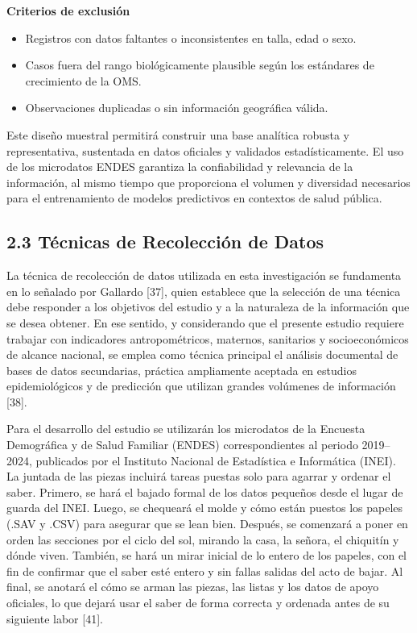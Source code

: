 \documentclass[
]{report}
\begin{document}
\textbf{Criterios de exclusión}

\begin{itemize}
\item
  Registros con datos faltantes o inconsistentes en talla, edad o sexo.
\item
  Casos fuera del rango biológicamente plausible según los estándares de
  crecimiento de la OMS.
\item
  Observaciones duplicadas o sin información geográfica válida.
\end{itemize}

Este diseño muestral permitirá construir una base analítica robusta y
representativa, sustentada en datos oficiales y validados
estadísticamente. El uso de los microdatos ENDES garantiza la
confiabilidad y relevancia de la información, al mismo tiempo que
proporciona el volumen y diversidad necesarios para el entrenamiento de
modelos predictivos en contextos de salud pública.

\hypertarget{tuxe9cnicas-de-recolecciuxf3n-de-datos}{%
\subsection{2.3 Técnicas de Recolección de
Datos}\label{tuxe9cnicas-de-recolecciuxf3n-de-datos}}

La técnica de recolección de datos utilizada en esta investigación se
fundamenta en lo señalado por Gallardo {[}37{]}, quien establece que la
selección de una técnica debe responder a los objetivos del estudio y a
la naturaleza de la información que se desea obtener. En ese sentido, y
considerando que el presente estudio requiere trabajar con indicadores
antropométricos, maternos, sanitarios y socioeconómicos de alcance
nacional, se emplea como técnica principal el análisis documental de
bases de datos secundarias, práctica ampliamente aceptada en estudios
epidemiológicos y de predicción que utilizan grandes volúmenes de
información {[}38{]}.

Para el desarrollo del estudio se utilizarán los microdatos de la
Encuesta Demográfica y de Salud Familiar (ENDES) correspondientes al
periodo 2019--2024, publicados por el Instituto Nacional de Estadística
e Informática (INEI). La juntada de las piezas incluirá tareas puestas
solo para agarrar y ordenar el saber. Primero, se hará el bajado formal
de los datos pequeños desde el lugar de guarda del INEI. Luego, se
chequeará el molde y cómo están puestos los papeles (.SAV y .CSV) para
asegurar que se lean bien. Después, se comenzará a poner en orden las
secciones por el ciclo del sol, mirando la casa, la señora, el chiquitín
y dónde viven. También, se hará un mirar inicial de lo entero de los
papeles, con el fin de confirmar que el saber esté entero y sin fallas
salidas del acto de bajar. Al final, se anotará el cómo se arman las
piezas, las listas y los datos de apoyo oficiales, lo que dejará usar el
saber de forma correcta y ordenada antes de su siguiente labor {[}41{]}.
\end{document}
